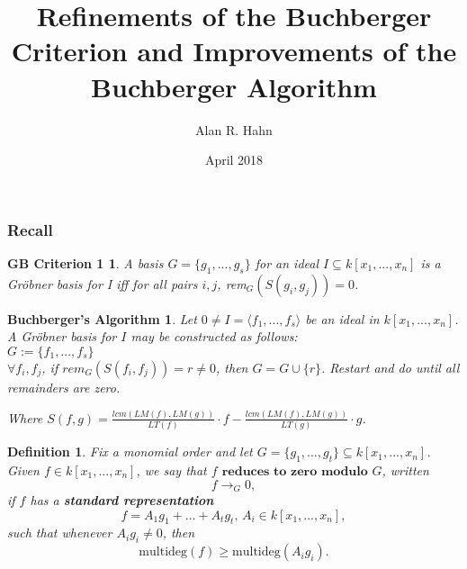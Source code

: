 \documentclass{beamer}
\title[Buchberger's Algorithm]{Refinements of the Buchberger Criterion and Improvements of the Buchberger Algorithm}
\author{Alan R. Hahn}
\institute{Clemson University}
\date{April 2018}
\newtheorem{defn}[prop]{Definition}
\newtheorem{BA}{Buchberger's Algorithm}
\newtheorem{gbc1}{GB Criterion 1}
\newtheorem{rmk}{Remark}
\begin{document}
\begin{frame}
  \titlepage
\end{frame}


\begin{frame}
\frametitle{Recall}

\begin{gbc1}
A basis $G = \{g_1,...,g_s\}$ for an ideal $I \subseteq k[x_1,...,x_n]$ is a Gr{\"o}bner basis for I iff for all pairs $i,j$, rem$_G(S(g_i,g_j)) = 0$. 
\end{gbc1}

\begin{BA}
Let $0\neq I = \langle f_1,...,f_s\rangle$ be an ideal in $k[x_1,...,x_n]$. A Gr{\"o}bner basis for $I$ may be constructed as follows: 
\\$G := \{f_1,...,f_s\}$
\\$\forall f_i,f_j$, if $rem_G(S(f_i,f_j)) = r \neq 0$, then $G = G\cup \{r\}$. 
Restart and do until all remainders are zero. 

\vspace{3mm} Where $S(f,g) = \frac{lcm(LM(f),LM(g))}{LT(f)}\cdot f - \frac{lcm(LM(f),LM(g))}{LT(g)}\cdot g$.
\end{BA}





\end{frame}



\begin{frame}
\begin{defn}
Fix a monomial order and let $G = \{g_1,...,g_t\} \subseteq k[x_1,...,x_n]$. Given $f\in k[x_1,...,x_n]$, we say that $f$ $\textbf{reduces to zero modulo $G$}$, written $$f\rightarrow_G 0,$$ if $f$ has a \textbf{standard representation} $$f = A_1g_1 + ... + A_tg_t\text{, }A_i\in k[x_1,...,x_n],$$ such that whenever $A_ig_i \neq 0$, then $$\text{multideg}(f)\geq \text{multideg}(A_ig_i).$$
\end{defn}


\end{frame}
\end{document}
